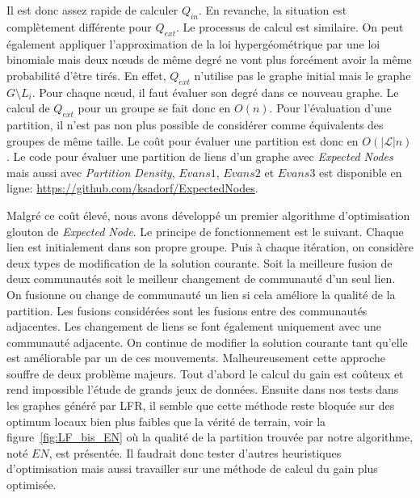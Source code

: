 Il est donc assez rapide de calculer $Q_{in}$.
En revanche, la situation est complètement différente pour $Q_{ext}$.
Le processus de calcul est similaire.
On peut également appliquer l'approximation de la loi hypergéométrique par une loi binomiale mais deux n\oe uds de même degré ne vont plus forcément avoir la même probabilité d'être tirés.
En effet, $Q_{ext}$ n'utilise pas le graphe initial mais le graphe $G\setminus L_i$.
Pour chaque n\oe ud, il faut évaluer son degré dans ce nouveau graphe.
Le calcul de $Q_{ext}$ pour un groupe se fait donc en $O(n)$.
Pour l'évaluation d'une partition, il n'est pas non plus possible de considérer comme équivalents des groupes de même taille.
Le coût pour évaluer une partition est donc en $O(|\mathcal{L}|n)$.
Le code pour évaluer une partition de liens d'un graphe avec \emph{Expected Nodes} mais aussi avec \emph{Partition Density}, $Evans1$, $Evans2$ et $Evans3$ est disponible en ligne: \url{https://github.com/ksadorf/ExpectedNodes}.


Malgré ce coût élevé, nous avons développé un premier algorithme d'optimisation glouton de \emph{Expected Node}.
Le principe de fonctionnement est le suivant.
Chaque lien est initialement dans son propre groupe.
Puis à chaque itération, on considère deux types de modification de la solution courante.
Soit la meilleure fusion de deux communautés soit le meilleur changement de communauté d'un seul lien.
On fusionne ou change de communauté un lien si cela améliore la qualité de la partition.
Les fusions considérées sont les fusions entre des communautés adjacentes.
Les changement de liens se font également uniquement avec une communauté adjacente.
On continue de modifier la solution courante tant qu'elle est améliorable par un de ces mouvements.
Malheureusement cette approche souffre de deux problème majeurs.
Tout d'abord le calcul du gain est coûteux et rend impossible l'étude de grands jeux de données.
Ensuite dans nos tests dans les graphes généré par LFR, il semble que cette méthode reste bloquée sur des optimum locaux bien plus faibles que la vérité de terrain, voir la figure~\ref{fig:LF_bis_EN} où la qualité de la partition trouvée par notre algorithme, noté $EN$, est présentée.
Il faudrait donc tester d'autres heuristiques d'optimisation mais aussi travailler sur une méthode de calcul du gain plus optimisée.

